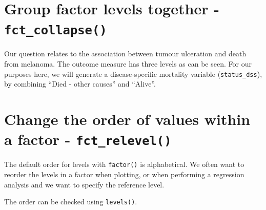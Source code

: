 \documentclass[
  12pt,
  krantz2]{krantz}
\makeatletter
\newenvironment{Shaded}{\begin{snugshade}}{\end{snugshade}}
\newcommand{\CommentTok}[1]{\textcolor[rgb]{0.56,0.35,0.01}{\textit{#1}}}
\newcommand{\DataTypeTok}[1]{\textcolor[rgb]{0.13,0.29,0.53}{#1}}
\newcommand{\KeywordTok}[1]{\textcolor[rgb]{0.13,0.29,0.53}{\textbf{#1}}}
\newcommand{\NormalTok}[1]{#1}
\newcommand{\OperatorTok}[1]{\textcolor[rgb]{0.81,0.36,0.00}{\textbf{#1}}}
\newcommand{\StringTok}[1]{\textcolor[rgb]{0.31,0.60,0.02}{#1}}
\newenvironment{kframe}{%
\medskip{}
\setlength{\fboxsep}{.8em}
 \def\at@end@of@kframe{}%
 \ifinner\ifhmode%
  \def\at@end@of@kframe{\end{minipage}}%
  \begin{minipage}{\columnwidth}%
 \fi\fi%
 \def\FrameCommand##1{\hskip\@totalleftmargin \hskip-\fboxsep
 \colorbox{shadecolor}{##1}\hskip-\fboxsep
     \hskip-\linewidth \hskip-\@totalleftmargin \hskip\columnwidth}%
 \MakeFramed {\advance\hsize-\width
   \@totalleftmargin\z@ \linewidth\hsize
   \@setminipage}}%
 {\par\unskip\endMakeFramed%
 \at@end@of@kframe}
\renewenvironment{Shaded}{\begin{kframe}}{\end{kframe}}
\makeatother
\begin{document}
\hypertarget{group-factor-levels-together---fct_collapse}{%
\section{\texorpdfstring{Group factor levels together - \texttt{fct\_collapse()}}{Group factor levels together - fct\_collapse()}}\label{group-factor-levels-together---fct_collapse}}


Our question relates to the association between tumour ulceration and death from melanoma.
The outcome measure has three levels as can be seen.
For our purposes here, we will generate a disease-specific mortality variable (\texttt{status\_dss}), by combining ``Died - other causes'' and ``Alive''.

\begin{Shaded}
\end{Shaded}

\hypertarget{chap08-h2-fct-relevel}{%
\section{\texorpdfstring{Change the order of values within a factor - \texttt{fct\_relevel()}}{Change the order of values within a factor - fct\_relevel()}}\label{chap08-h2-fct-relevel}}


The default order for levels with \texttt{factor()} is alphabetical.
We often want to reorder the levels in a factor when plotting, or when performing a regression analysis and we want to specify the reference level.

The order can be checked using \texttt{levels()}.

\begin{Shaded}
\end{Shaded}
\end{document}
